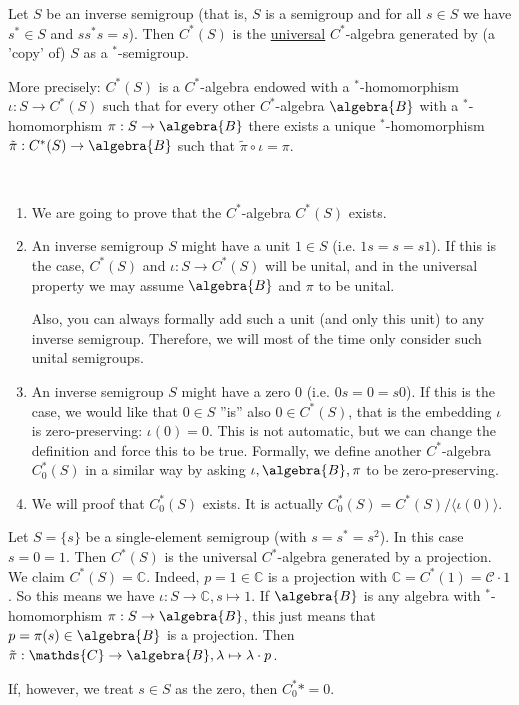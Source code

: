 \documentclass[a4paper]{article}
\begin{document}
\begin{definition}
	Let $S$ be an inverse semigroup (that is, $S$ is a semigroup and for all $s \in S$ we have $s^* \in S$ and $ss^*s = s$).
	Then $C^*(S)$ is the \underline{universal} $C^*$-algebra generated by (a 'copy' of) $S$ as a $^*$-semigroup.

	More precisely: $C^*(S)$ is a $C^*$-algebra endowed with a $^*$-homomorphism $\iota: S \to C^*(S)$ such that for every other $C^*$-algebra $\algebra{B}$ with a $^*$-homomorphism $\pi: S \to \algebra{B}$ there exists a unique $^*$-homomorphism $\tilde{\pi}: C^*(S) \to \algebra{B}$ such that $\tilde{\pi} \circ \iota = \pi$.
\end{definition}

\begin{remark}~
	\begin{enumerate}
		\item We are going to prove that the $C^*$-algebra $C^*(S)$ exists.
		\item An inverse semigroup $S$ might have a unit $1 \in S$ (i.e. $1s = s = s1$).
		If this is the case, $C^*(S)$ and $\iota: S \to C^*(S)$ will be unital, and in the universal property we may assume $\algebra{B}$ and $\pi$ to be unital.		
		
		Also, you can always formally add such a unit (and only this unit) to any inverse semigroup.
		Therefore, we will most of the time only consider such unital semigroups.
		\item An inverse semigroup $S$ might have a zero $0$ (i.e. $0s = 0 = s0$).
		If this is the case, we would like that $0 \in S$ ''is'' also $0 \in C^*(S)$, that is the embedding $\iota$ is zero-preserving: $\iota(0) = 0$.
		This is not automatic, but we can change the definition and force this to be true.
		Formally, we define another $C^*$-algebra $C^*_0(S)$ in a similar way by asking $\iota, \algebra{B}, \pi$ to be zero-preserving.
		\item We will proof that $C^*_0(S)$ exists.
		It is actually $C^*_0(S) = C^*(S)/\langle \iota(0) \rangle$.
	\end{enumerate}
\end{remark}

\begin{example}
	Let $S = \{s\}$ be a single-element semigroup (with $s = s^* = s^2$).
	In this case $s = 0 = 1$.
	Then $C^*(S)$ is the universal $C^*$-algebra generated by a projection.
	We claim $C^*(S) = \mathds{C}$.
	Indeed, $p = 1 \in \mathds{C}$ is a projection with $\mathds{C} = C^*(1) =\mathscr{C} \cdot 1$.
	So this means we have $\iota: S \to \mathds{C}, s \mapsto 1$.
	If $\algebra{B}$ is any algebra with $^*$-homomorphism $\pi: S \to \algebra{B}$, this just means that $p = \pi(s) \in \algebra{B}$ is a projection. 
	Then $\tilde{\pi}: \mathds{C} \to \algebra{B}, \lambda \mapsto \lambda \cdot p$.

	If, however, we treat $s \in S$ as the zero, then $C^*_0* = 0$.
\end{example}
\end{document}
